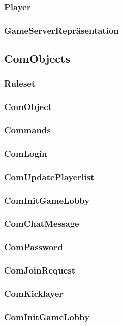 \documentclass{article}
\begin{document}
\subsubsection{Player}
\subsubsection{GameServerRepräsentation}
\newpage

\subsection{ComObjects}
\subsubsection{Ruleset}
\subsubsection{ComObject}
\subsubsection{Commands}
\subsubsection{ComLogin}
\subsubsection{ComUpdatePlayerlist}
\subsubsection{ComInitGameLobby}
\subsubsection{ComChatMessage}
\subsubsection{ComPassword}
\subsubsection{ComJoinRequest}
\subsubsection{ComKicklayer}
\subsubsection{ComInitGameLobby}
\end{document}
